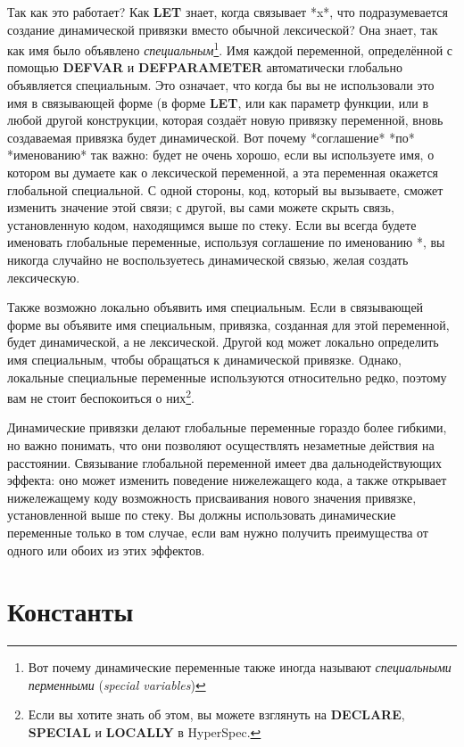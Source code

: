 Так как это работает? Как \textbf{LET} знает, когда связывает *x*, что подразумевается
создание динамической привязки вместо обычной лексической? Она знает, так как имя было
объявлено \textit{специальным}\footnote{Вот почему динамические переменные также иногда
  называют \textit{специальными перменными} (\textit{special variables}) }. Имя каждой
переменной, определённой с помощью \textbf{DEFVAR} и \textbf{DEFPARAMETER} автоматически
глобально объявляется специальным. Это означает, что когда бы вы не использовали это имя в
связывающей форме (в форме \textbf{LET}, или как параметр функции, или в любой другой
конструкции, которая создаёт новую привязку переменной, вновь создаваемая привязка будет
динамической. Вот почему *соглашение* *по* *именованию* так важно: будет не очень хорошо,
если вы используете имя, о котором вы думаете как о лексической переменной, а эта
переменная окажется глобальной специальной. С одной стороны, код, который вы вызываете,
сможет изменить значение этой связи; с другой, вы сами можете скрыть связь, установленную
кодом, находящимся выше по стеку. Если вы всегда будете именовать глобальные переменные,
используя соглашение по именованию *, вы никогда случайно не воспользуетесь динамической
связью, желая создать лексическую.

Также возможно локально объявить имя специальным. Если в связывающей форме вы объявите имя
специальным, привязка, созданная для этой переменной, будет динамической, а не
лексической. Другой код может локально определить имя специальным, чтобы обращаться к
динамической привязке. Однако, локальные специальные переменные используются относительно
редко, поэтому вам не стоит беспокоиться о них\footnote{Если вы хотите знать об этом, вы
  можете взглянуть на \textbf{DECLARE}, \textbf{SPECIAL} и \textbf{LOCALLY} в HyperSpec.}.

Динамические привязки делают глобальные переменные гораздо более гибкими, но важно понимать, что они позволяют осуществлять незаметные действия на расстоянии. Связывание глобальной переменной имеет два дальнодействующих эффекта: оно может изменить поведение нижележащего кода, а также открывает нижележащему коду возможность присваивания нового значения привязке, установленной выше по стеку. Вы должны использовать динамические переменные только в том случае, если вам нужно получить преимущества от одного или обоих из этих эффектов.

\section{Константы}

